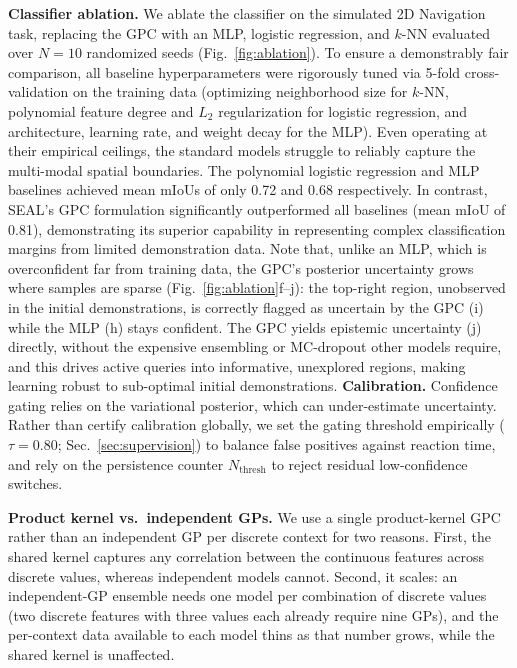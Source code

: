 \textbf{Classifier ablation.} We ablate the classifier on the simulated 2D Navigation task, replacing the GPC with an MLP, logistic regression, and $k$-NN evaluated over $N=10$ randomized seeds (Fig.~\ref{fig:ablation}). To ensure a demonstrably fair comparison, all baseline hyperparameters were rigorously tuned via 5-fold cross-validation on the training data (optimizing neighborhood size for $k$-NN, polynomial feature degree and $L_2$ regularization for logistic regression, and architecture, learning rate, and weight decay for the MLP). Even operating at their empirical ceilings, the standard models struggle to reliably capture the multi-modal spatial boundaries. The polynomial logistic regression and MLP baselines achieved mean mIoUs of only 0.72 and 0.68 respectively. In contrast, SEAL's GPC formulation significantly outperformed all baselines (mean mIoU of 0.81), demonstrating its superior capability in representing complex classification margins from limited demonstration data. Note that, unlike an MLP, which is overconfident far from training data, the GPC's posterior uncertainty grows where samples are sparse (Fig.~\ref{fig:ablation}f--j): the top-right region, unobserved in the initial demonstrations, is correctly flagged as uncertain by the GPC (i) while the MLP (h) stays confident. The GPC yields epistemic uncertainty (j) directly, without the expensive ensembling or MC-dropout other models require, and this drives active queries into informative, unexplored regions, making learning robust to sub-optimal initial demonstrations. \textbf{Calibration.} Confidence gating relies on the variational posterior, which can under-estimate uncertainty. Rather than certify calibration globally, we set the gating threshold empirically ($\tau=0.80$; Sec.~\ref{sec:supervision}) to balance false positives against reaction time, and rely on the persistence counter $N_{\text{thresh}}$ to reject residual low-confidence switches.


 \textbf{Product kernel vs.\ independent GPs.} We use a single product-kernel GPC rather than an independent GP per discrete context for two reasons. First, the shared kernel captures any correlation between the continuous features across discrete values, whereas independent models cannot. Second, it scales: an independent-GP ensemble needs one model per combination of discrete values (two discrete features with three values each already require nine GPs), and the per-context data available to each model thins as that number grows, while the shared kernel is unaffected.

